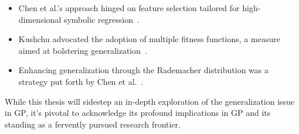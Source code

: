     \begin{itemize}
      \item Chen et al.'s approach hinged on feature selection tailored for 
        high-dimensional symbolic 
        regression~\autocite{chenFeatureSelectionImprove2017}.
      \item Kushchu advocated the adoption of multiple fitness functions, a 
        measure aimed at bolstering 
        generalization~\autocite{kushchuGeneticProgrammingEvolutionary2002}.
      \item Enhancing generalization through the Rademacher distribution was a 
        strategy put forth by Chen et 
        al.~\autocite{chenRademacherComplexityEnhancing2022}.
    \end{itemize}

    While this thesis will sidestep an in-depth exploration of the 
    generalization issue in GP, it's pivotal to acknowledge its profound 
    implications in GP and its standing as a fervently pursued research 
    frontier.
